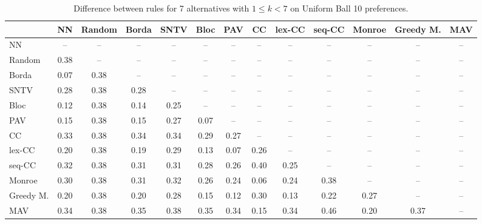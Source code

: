 
\begin{table*}[h!]
\centering
\begin{tabular}{lcccccccccccc}
\toprule
 & NN & Random & Borda & SNTV & Bloc & PAV & CC & lex-CC & seq-CC & Monroe & Greedy M. & MAV \\
\midrule
NN & -- & -- & -- & -- & -- & -- & -- & -- & -- & -- & -- & -- \\
Random & 0.38 & -- & -- & -- & -- & -- & -- & -- & -- & -- & -- & -- \\
Borda & 0.07 & 0.38 & -- & -- & -- & -- & -- & -- & -- & -- & -- & -- \\
SNTV & 0.28 & 0.38 & 0.28 & -- & -- & -- & -- & -- & -- & -- & -- & -- \\
Bloc & 0.12 & 0.38 & 0.14 & 0.25 & -- & -- & -- & -- & -- & -- & -- & -- \\
PAV & 0.15 & 0.38 & 0.15 & 0.27 & 0.07 & -- & -- & -- & -- & -- & -- & -- \\
CC & 0.33 & 0.38 & 0.34 & 0.34 & 0.29 & 0.27 & -- & -- & -- & -- & -- & -- \\
lex-CC & 0.20 & 0.38 & 0.19 & 0.29 & 0.13 & 0.07 & 0.26 & -- & -- & -- & -- & -- \\
seq-CC & 0.32 & 0.38 & 0.31 & 0.31 & 0.28 & 0.26 & 0.40 & 0.25 & -- & -- & -- & -- \\
Monroe & 0.30 & 0.38 & 0.31 & 0.32 & 0.26 & 0.24 & 0.06 & 0.24 & 0.38 & -- & -- & -- \\
Greedy M. & 0.20 & 0.38 & 0.20 & 0.28 & 0.15 & 0.12 & 0.30 & 0.13 & 0.22 & 0.27 & -- & -- \\
MAV & 0.34 & 0.38 & 0.35 & 0.38 & 0.35 & 0.34 & 0.15 & 0.34 & 0.46 & 0.20 & 0.37 & -- \\
\bottomrule
\end{tabular}

\caption{Difference between rules for 7 alternatives with $1 \leq k < 7$ on Uniform Ball 10 preferences.}
\end{table*}
